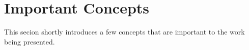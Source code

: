\section{Important Concepts}
\label{sec:important-concepts}

This secion shortly introduces a few concepts that are important to the work being presented.

\incomplete




